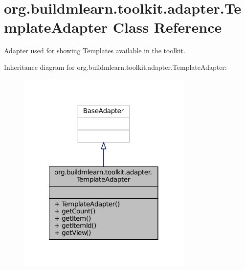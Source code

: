 \hypertarget{classorg_1_1buildmlearn_1_1toolkit_1_1adapter_1_1TemplateAdapter}{\section{org.\-buildmlearn.\-toolkit.\-adapter.\-Template\-Adapter Class Reference}
\label{classorg_1_1buildmlearn_1_1toolkit_1_1adapter_1_1TemplateAdapter}
}


Adapter used for showing Templates available in the toolkit.  




Inheritance diagram for org.\-buildmlearn.\-toolkit.\-adapter.\-Template\-Adapter\-:
\nopagebreak
\begin{figure}[H]
\begin{center}
\leavevmode
\includegraphics[width=246pt]{df/d01/classorg_1_1buildmlearn_1_1toolkit_1_1adapter_1_1TemplateAdapter__inherit__graph}
\end{center}
\end{figure}


